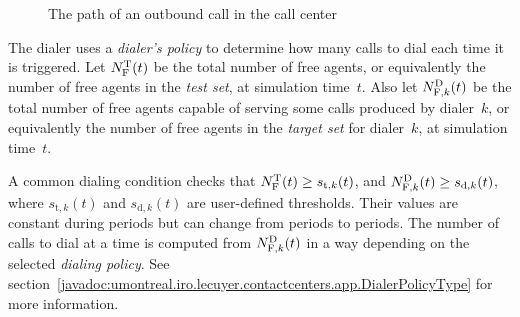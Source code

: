 \begin{figure}
\centering

\caption{The path of an outbound call in the call center}
\label{fig:outbound}
\end{figure}

The dialer uses a \emph{dialer's policy} to determine how many calls
to dial each time it is triggered.
Let $\Ntf(t)$ be the total number of free agents, or
equivalently the number of free agents in the \emph{test set}, at simulation
time~$t$.  Also let
$\Ndf[k](t)$ be the total number of free agents capable of serving
some calls produced by dialer~$k$, or equivalently the number of free agents in the
\emph{target set} for dialer~$k$, at simulation time~$t$.

A common dialing condition checks that $\Ntf(t)\ge s_{\mathrm{t}, k}(t)$,
and $\Ndf[k](t)\ge s_{\mathrm{d}, k}(t)$, where
$s_{\mathrm{t}, k}(t)$ and
$s_{\mathrm{d}, k}(t)$ are user-defined thresholds. Their values are
constant during periods but can change from periods to periods.
The number of calls to dial at a time is computed from $\Ndf[k](t)$ in
a way depending on the selected \emph{dialing policy}.
See
section~\ref{javadoc:umontreal.iro.lecuyer.contactcenters.app.DialerPolicyType}
for more information.


